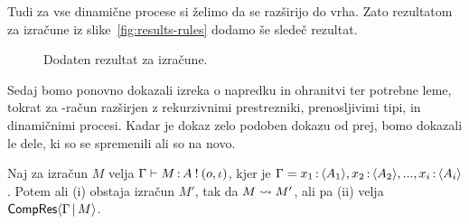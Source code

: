 Tudi za vse dinamične procese si želimo da se razširijo do vrha. Zato rezultatom za izračune iz slike~\ref{fig:results-rules} dodamo še sledeč rezultat. 

\begin{figure}[H]
	\centering
	\begin{mathpar}
	\end{mathpar}
	\vspace{-5ex}
	\caption{Dodaten rezultat za izračune.}
	\label{fig:results-rules-2}
\end{figure}

Sedaj bomo ponovno dokazali izreka o napredku in ohranitvi ter potrebne leme, tokrat za \lae{}-račun razširjen z rekurzivnimi prestrezniki, prenosljivimi tipi, in dinamičnimi procesi. Kadar je dokaz zelo podoben dokazu od prej, bomo dokazali le dele, ki so se spremenili ali so na novo. 

\begin{trditev}[o napredku]\label{trd:gamma-napredek-2}
	Naj za izračun $M$ velja $\Gamma \types M \of \tycomp{A}{\o, \i}$, kjer je $\Gamma = x_1 \of \typromise{A_1}, x_2 \of \typromise{A_2},..., x_i \of \typromise{A_i}$. Potem ali (i) obstaja izračun $M'$, tak da $M \reduces M'$, ali pa (ii) velja $\CompResult{\Gamma}{M}$.
\end{trditev}

